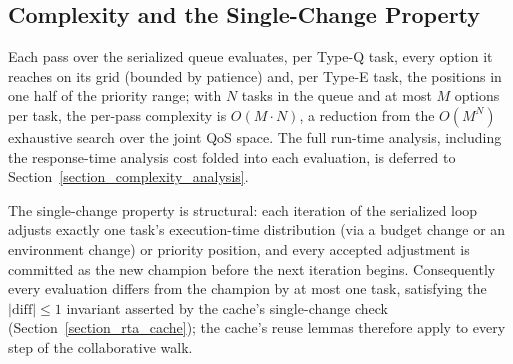     \subsection{Complexity and the Single-Change Property}
    \label{section_complexity_single_change}

    Each pass over the serialized queue evaluates, per Type-Q task, every option it reaches on its grid (bounded by patience) and, per Type-E task, the positions in one half of the priority range; with $N$ tasks in the queue and at most $M$ options per task, the per-pass complexity is $O(M \cdot N)$, a reduction from the $O(M^N)$ exhaustive search over the joint QoS space.
    The full run-time analysis, including the response-time analysis cost folded into each evaluation, is deferred to Section~\ref{section_complexity_analysis}.

    The single-change property is structural: each iteration of the serialized loop adjusts exactly one task's execution-time distribution (via a budget change or an environment change) or priority position, and every accepted adjustment is committed as the new champion before the next iteration begins.
    Consequently every evaluation differs from the champion by at most one task, satisfying the $|\mathrm{diff}| \leq 1$ invariant asserted by the cache's single-change check (Section~\ref{section_rta_cache}); the cache's reuse lemmas therefore apply to every step of the collaborative walk.
